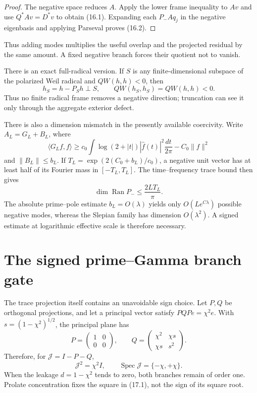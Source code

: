 \documentclass[11pt]{amsart}
\theoremstyle{definition}
\theoremstyle{remark}
\newcommand{\Ran}{\operatorname{Ran}}
\newcommand{\Spec}{\operatorname{Spec}}
\begin{document}
\begin{proof}
The negative space reduces \(A\).  Apply the lower frame inequality to
\(Av\) and use \(Q^*Av=D^*v\) to obtain (16.1).  Expanding each
\(P_-Aq_j\) in the negative eigenbasis and applying Parseval proves
(16.2).
\end{proof}

Thus adding modes multiplies the useful overlap and the projected residual
by the same amount.  A fixed negative branch forces their quotient not to
vanish.

There is an exact full-radical version.  If \(S\) is any finite-dimensional
subspace of the polarized Weil radical and \(QW(h,h)<0\), then
\[
 h_S=h-P_Sh\perp S,
 \qquad QW(h_S,h_S)=QW(h,h)<0.
\]
Thus no finite radical frame removes a negative direction; truncation can
see it only through the aggregate exterior defect.

There is also a dimension mismatch in the presently available coercivity.
Write \(A_L=G_L+B_L\), where
\[
 \langle G_Lf,f\rangle
 \ge c_0\int\log(2+|t|)|\widehat f(t)|^2\frac{dt}{2\pi}
      -C_0\|f\|^2
\]
and \(\|B_L\|\le b_L\).  If
\(T_L=\exp(2(C_0+b_L)/c_0)\), a negative unit vector has at least half of
its Fourier mass in \([-T_L,T_L]\).  The time--frequency trace bound then
gives
\[
 \dim\Ran P_-\le\frac{2LT_L}{\pi}.
 \tag{16.3}
\]
The absolute prime--pole estimate \(b_L=O(\lambda)\) yields only
\(O(Le^{C\lambda})\) possible negative modes, whereas the Slepian family
has dimension \(O(\lambda^2)\).  A signed estimate at logarithmic effective
scale is therefore necessary.

\section{The signed prime--Gamma branch gate}
\label{sec:spg}

The trace projection itself contains an unavoidable sign choice.  Let
\(P,Q\) be orthogonal projections, and let a principal vector satisfy
\(PQP e=\chi^2e\).  With \(s=(1-\chi^2)^{1/2}\), the principal plane has
\[
 P=\begin{pmatrix}1&0\\0&0\end{pmatrix},
 \qquad
 Q=\begin{pmatrix}\chi^2&\chi s\\\chi s&s^2\end{pmatrix}.
\]
Therefore, for \(\mathcal J=I-P-Q\),
\[
 \boxed{
 \mathcal J^2=\chi^2I,
 \qquad \Spec\mathcal J=\{-\chi,+\chi\}.}
 \tag{17.1}
\]
When the leakage \(d=1-\chi^2\) tends to zero, both branches remain of
order one.  Prolate concentration fixes the square in (17.1), not the sign
of its square root.
\end{document}
